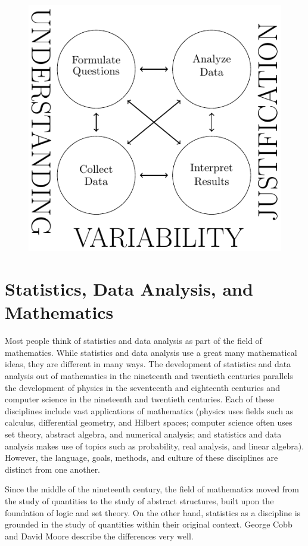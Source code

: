\documentclass[
]{book}
\theoremstyle{definition}
\theoremstyle{definition}
\theoremstyle{definition}
\theoremstyle{definition}
\theoremstyle{remark}
\begin{document}
\begin{figure}

{\centering \includegraphics[width=0.7\linewidth]{tikz/GAISE2} 

}

\end{figure}

\hypertarget{statistics-data-analysis-and-mathematics}{%
\section{Statistics, Data Analysis, and Mathematics}\label{statistics-data-analysis-and-mathematics}}

Most people think of statistics and data analysis as part of the field of mathematics. While statistics and data analysis use a great many mathematical ideas, they are different in many ways. The development of statistics and data analysis out of mathematics in the nineteenth and twentieth centuries parallels the development of physics in the seventeenth and eighteenth centuries and computer science in the nineteenth and twentieth centuries. Each of these disciplines include vast applications of mathematics (physics uses fields such as calculus, differential geometry, and Hilbert spaces; computer science often uses set theory, abstract algebra, and numerical analysis; and statistics and data analysis makes use of topics such as probability, real analysis, and linear algebra). However, the language, goals, methods, and culture of these disciplines are distinct from one another.

Since the middle of the nineteenth century, the field of mathematics moved from the study of quantities to the study of abstract structures, built upon the foundation of logic and set theory. On the other hand, statistics as a discipline is grounded in the study of quantities within their original context. George Cobb and David Moore \citeyearpar{Cobb1997} describe the differences very well.
\end{document}
